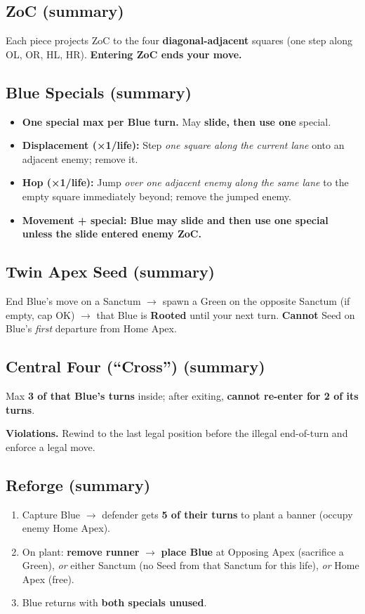 \documentclass[11pt]{article}
\begin{document}
\subsection*{ZoC (summary)}
Each piece projects ZoC to the four \textbf{diagonal-adjacent} squares (one step along OL, OR, HL, HR). \textbf{Entering ZoC ends your move.}

\subsection*{Blue Specials (summary)}
\begin{itemize}
  \item \textbf{One special max per Blue turn.} May \textbf{slide, then use one} special.
  \item \textbf{Displacement (×1/life):} Step \emph{one square along the current lane} onto an adjacent enemy; remove it.
  \item \textbf{Hop (×1/life):} Jump \emph{over one adjacent enemy along the same lane} to the empty square immediately beyond; remove the jumped enemy.
  \item \textbf{Movement + special: Blue may slide and then use one special unless the slide entered enemy ZoC.}
\end{itemize}

\subsection*{Twin Apex Seed (summary)}
End Blue’s move on a Sanctum $\rightarrow$ spawn a Green on the opposite Sanctum (if empty, cap OK) $\rightarrow$ that Blue is \textbf{Rooted} until your next turn. \textbf{Cannot} Seed on Blue’s \emph{first} departure from Home Apex.

\subsection*{Central Four (“Cross”) (summary)}
Max \textbf{3 of that Blue’s turns} inside; after exiting, \textbf{cannot re-enter for 2 of its turns}.

\noindent\textbf{Violations.} Rewind to the last legal position before the illegal end-of-turn and enforce a legal move.

\subsection*{Reforge (summary)}
\begin{enumerate}
  \item Capture Blue $\rightarrow$ defender gets \textbf{5 of their turns} to plant a banner (occupy enemy Home Apex).
  \item On plant: \textbf{remove runner} $\rightarrow$ \textbf{place Blue} at Opposing Apex (sacrifice a Green), \emph{or} either Sanctum (no Seed from that Sanctum for this life), \emph{or} Home Apex (free).
  \item Blue returns with \textbf{both specials unused}.
\end{enumerate}
\end{document}
